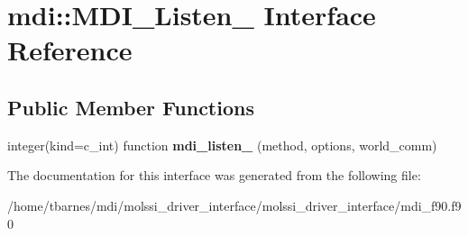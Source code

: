 \hypertarget{interfacemdi_1_1MDI__Listen__}{\section{mdi\-:\-:M\-D\-I\-\_\-\-Listen\-\_\- Interface Reference}
\label{interfacemdi_1_1MDI__Listen__}
}
\subsection*{Public Member Functions}
\begin{DoxyCompactItemize}
\item 
\hypertarget{interfacemdi_1_1MDI__Listen___a8e33fb18e414e52cc7224a2c69b33009}{integer(kind=c\-\_\-int) function {\bfseries mdi\-\_\-listen\-\_\-} (method, options, world\-\_\-comm)}\label{interfacemdi_1_1MDI__Listen___a8e33fb18e414e52cc7224a2c69b33009}

\end{DoxyCompactItemize}


The documentation for this interface was generated from the following file\-:\begin{DoxyCompactItemize}
\item 
/home/tbarnes/mdi/molssi\-\_\-driver\-\_\-interface/molssi\-\_\-driver\-\_\-interface/mdi\-\_\-f90.\-f90\end{DoxyCompactItemize}
